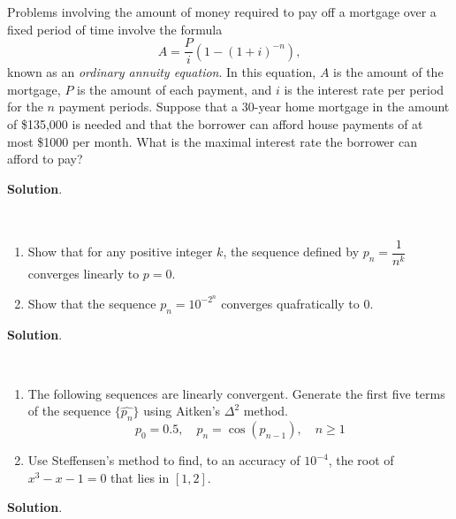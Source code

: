 \documentclass[11pt]{article}
\theoremstyle{break}
\numberwithin{equation}{theorem}
\begin{document}
\newpage
\begin{problem}\label{problem 8}
    Problems involving the amount of money required to pay off a mortgage over a fixed period of time involve the formula
    \begin{equation*}
        A=\dfrac{P}{i}\left(1-(1+i)^{-n}\right),
    \end{equation*}
    known as an \emph{ordinary annuity equation}. In this equation, $A$ is the amount of the mortgage, $P$ is the amount of each payment, and $i$ is the interest rate per period for the $n$ payment periods. Suppose that a 30-year home mortgage in the amount of \$135,000 is needed and that the borrower can afford house payments of at most \$1000 per month. What is the maximal interest rate the borrower can afford to pay?
\end{problem}
\textbf{Solution}.


\newpage
\begin{problem}\label{problem 9}$\ $
    \begin{enumerate}
        \item Show that for any positive integer $k$, the sequence defined by $p_n=\dfrac{1}{n^k}$ converges linearly to $p=0$.
        \item Show that the sequence $p_n=10^{-2^n}$ converges quafratically to $0$.
    \end{enumerate}
\end{problem}
\textbf{Solution}.


\newpage
\begin{problem}\label{problem 10}$\ $
    \begin{enumerate}
        \item The following sequences are linearly convergent. Generate the first five terms of the sequence $\{\hat{p_n}\}$ using Aitken's $\Delta^2$ method.
        \begin{equation*}
            p_0=0.5, \quad p_n=\cos(p_{n-1}), \quad n\geq 1
        \end{equation*}
        \item Use Steffensen's method to find, to an accuracy of $10^{-4}$, the root of $x^3-x-1=0$ that lies in $[1, 2]$.
    \end{enumerate}
\end{problem}
\textbf{Solution}.
\end{document}
